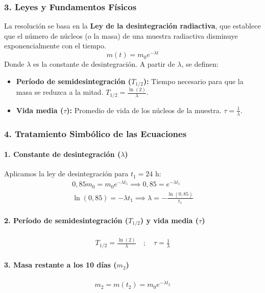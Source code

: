 \subsubsection*{3. Leyes y Fundamentos Físicos}
La resolución se basa en la \textbf{Ley de la desintegración radiactiva}, que establece que el número de núcleos (o la masa) de una muestra radiactiva disminuye exponencialmente con el tiempo.
$$ m(t) = m_0 e^{-\lambda t} $$
Donde $\lambda$ es la constante de desintegración. A partir de $\lambda$, se definen:
\begin{itemize}
    \item \textbf{Período de semidesintegración ($T_{1/2}$):} Tiempo necesario para que la masa se reduzca a la mitad. $T_{1/2} = \frac{\ln(2)}{\lambda}$.
    \item \textbf{Vida media ($\tau$):} Promedio de vida de los núcleos de la muestra. $\tau = \frac{1}{\lambda}$.
\end{itemize}

\subsubsection*{4. Tratamiento Simbólico de las Ecuaciones}
\paragraph*{1. Constante de desintegración ($\lambda$)}
Aplicamos la ley de desintegración para $t_1=24$ h:
\begin{gather}
    0,85 m_0 = m_0 e^{-\lambda t_1} \implies 0,85 = e^{-\lambda t_1} \nonumber \\[8pt]
    \ln(0,85) = -\lambda t_1 \implies \lambda = -\frac{\ln(0,85)}{t_1}
\end{gather}
\paragraph*{2. Período de semidesintegración ($T_{1/2}$) y vida media ($\tau$)}
\begin{gather}
    T_{1/2} = \frac{\ln(2)}{\lambda} \quad ; \quad \tau = \frac{1}{\lambda}
\end{gather}
\paragraph*{3. Masa restante a los 10 días ($m_2$)}
\begin{gather}
    m_2 = m(t_2) = m_0 e^{-\lambda t_2}
\end{gather}

